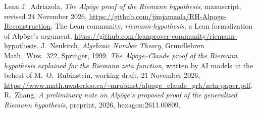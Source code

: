 \documentclass[reqno]{amsart}
\theoremstyle{definition}
\theoremstyle{plain}
\theoremstyle{remark}
\begin{document}
\begin{thebibliography}{Lean}
 J.~Adriazola, \emph{The Alp\"oge proof of the Riemann hypothesis}, manuscript, revised 24 November 2026, \url{https://github.com/jimjamzola/RH-Alpoge-Reconstruction}.
 The Lean community, \emph{riemann-hypothesis}, a Lean formalization of Alp\"oge's argument, \url{https://github.com/leanprover-community/riemann-hypothesis}.
 J.~Neukirch, \emph{Algebraic Number Theory}, Grundlehren Math.\ Wiss.\ 322, Springer, 1999.
 \emph{The Alp\"oge--Claude proof of the Riemann hypothesis explained for the Riemann zeta function}, written by AI models at the behest of M.~O.~Rubinstein, working draft, 21 November 2026, \url{https://www.math.uwaterloo.ca/~mrubinst/alpoge_claude_grh/zeta-paper.pdf}.
 R.~Zhang, \emph{A preliminary note on Alp\"oge's proposed proof of the generalized Riemann hypothesis}, preprint, 2026, hexagon:2611.00809.
\end{thebibliography}
\end{document}
